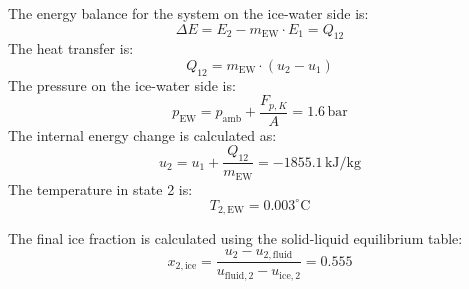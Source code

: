 The energy balance for the system on the ice-water side is:  
\[
\Delta E = E_2 - m_{\text{EW}} \cdot E_1 = Q_{12}
\]  
The heat transfer is:  
\[
Q_{12} = m_{\text{EW}} \cdot (u_2 - u_1)
\]  
The pressure on the ice-water side is:  
\[
p_{\text{EW}} = p_{\text{amb}} + \frac{F_{p,K}}{A} = 1.6 \, \text{bar}
\]  
The internal energy change is calculated as:  
\[
u_2 = u_1 + \frac{Q_{12}}{m_{\text{EW}}} = -1855.1 \, \text{kJ/kg}
\]  
The temperature in state 2 is:  
\[
T_{2,\text{EW}} = 0.003^\circ \text{C}
\]  

The final ice fraction is calculated using the solid-liquid equilibrium table:  
\[
x_{2,\text{ice}} = \frac{u_2 - u_{2,\text{fluid}}}{u_{\text{fluid},2} - u_{\text{ice},2}} = 0.555
\]